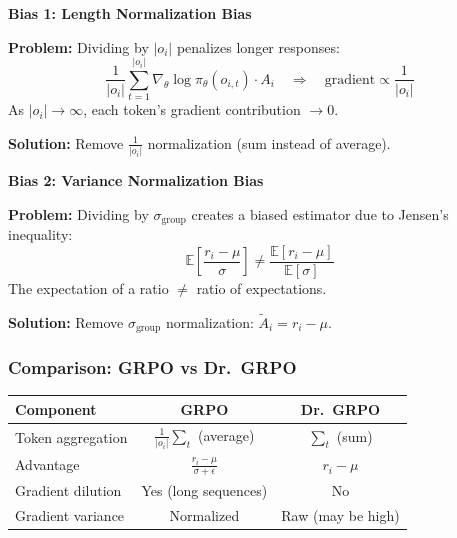 \documentclass[11pt,a4paper]{article}
\begin{document}
\begin{cautionbox}
\textbf{Bias 1: Length Normalization Bias}

\textbf{Problem:} Dividing by $|o_i|$ penalizes longer responses:
\begin{equation}
\frac{1}{|o_i|} \sum_{t=1}^{|o_i|} \nabla_\theta \log \pi_\theta(o_{i,t}) \cdot A_i \quad \Rightarrow \quad \text{gradient} \propto \frac{1}{|o_i|}
\end{equation}
As $|o_i| \to \infty$, each token's gradient contribution $\to 0$.

\textbf{Solution:} Remove $\frac{1}{|o_i|}$ normalization (sum instead of average).
\end{cautionbox}

\begin{cautionbox}
\textbf{Bias 2: Variance Normalization Bias}

\textbf{Problem:} Dividing by $\sigma_{\text{group}}$ creates a biased estimator due to Jensen's inequality:
\begin{equation}
\mathbb{E}\left[\frac{r_i - \mu}{\sigma}\right] \neq \frac{\mathbb{E}[r_i - \mu]}{\mathbb{E}[\sigma]}
\end{equation}
The expectation of a ratio $\neq$ ratio of expectations.

\textbf{Solution:} Remove $\sigma_{\text{group}}$ normalization: $\tilde{A}_i = r_i - \mu$.
\end{cautionbox}

\subsubsection{Comparison: GRPO vs Dr.~GRPO}

\begin{center}
\begin{tabular}{@{}lcc@{}}
\toprule
\textbf{Component} & \textbf{GRPO} & \textbf{Dr.~GRPO} \\
\midrule
Token aggregation & $\frac{1}{|o_i|}\sum_t$ (average) & $\sum_t$ (sum) \\
Advantage & $\frac{r_i - \mu}{\sigma + \epsilon}$ & $r_i - \mu$ \\
Gradient dilution & Yes (long sequences) & No \\
Gradient variance & Normalized & Raw (may be high) \\
\bottomrule
\end{tabular}
\end{center}

\end{document}
